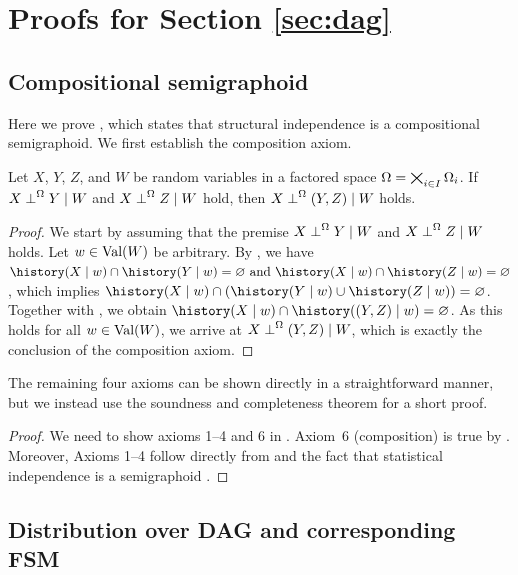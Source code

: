 \documentclass[USenglish,onecolumn]{article}
\begin{document}
\section{Proofs for Section \ref{sec:dag}}
\subsection{Compositional semigraphoid}
\label{sec:proofcomposition}

Here we prove , which states that structural independence is a compositional semigraphoid. We first establish the composition axiom.
\begin{lemma}
\label{lemma:composition}
  Let $X$, $Y$, $Z$, and $W$ be random variables in a factored space $\Omega=\bigtimes_{i\in I}\Omega_i$.
  If \(X\mathrel{\perp}^\Omega Y \mid W\) and \(X\mathrel{\perp}^\Omega Z\mid W\) hold, then \(X\mathrel{\perp}^\Omega (Y,Z)\mid W\) holds.
\end{lemma}
\begin{proof}
We start by assuming that the premise $X\mathrel{\perp}^\Omega Y \mid W$ and $X\mathrel{\perp}^\Omega Z\mid W$ holds.
Let $w\in \textnormal{Val}(W)$ be arbitrary.
By , we have
\(\history(X\given w)\cap\history(Y\given w)=\nothing \textnormal{ and } \history(X\given w)\cap\history(Z\given w)=\nothing\), which implies
\(\history(X\given w)\cap(\history(Y\given w) \cup\history(Z\given w))=\nothing\).
Together with , we obtain
\(\history(X\given w)\cap\history((Y,Z)\given w) =\nothing\).
As this holds for all $w\in \textnormal{Val}(W)$, we arrive at
\(X\mathrel{\perp}^\Omega (Y,Z)\mid W\),
which is exactly the conclusion of the composition axiom.
\end{proof}

The remaining four axioms can be shown directly in a straightforward manner, but we instead use the soundness and completeness theorem for a short proof.

\compositionalsemigraphoid*
\begin{proof}
We need to show axioms 1--4 and 6 in .
Axiom~6 (composition) is true by .
Moreover, Axioms 1--4 follow directly from  and the fact that statistical independence is a semigraphoid \cite{pearl1988probabilistic}.
\end{proof}


\subsection{Distribution over DAG and corresponding FSM}
\label{sec:proofdistributionconstruction}
\end{document}
